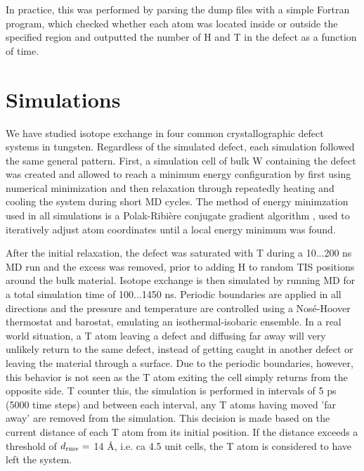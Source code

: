 In practice, this was performed by parsing the dump files with a simple Fortran program, which checked whether each atom was located inside or outside the specified region and outputted the number of H and T in the defect as a function of time.

\chapter{Simulations}

We have studied isotope exchange in four common crystallographic defect systems in tungsten. 
Regardless of the simulated defect, each simulation followed the same general pattern. 
First, a simulation cell of bulk W containing the defect was created and allowed to reach a minimum energy configuration by first using numerical minimization and then relaxation through repeatedly heating and cooling the system during short MD cycles. 
The method of energy minimzation used in all simulations is a Polak-Ribi\`{e}re conjugate gradient algorithm \cite{polak1969note}, used to iteratively adjust atom coordinates until a local energy minimum was found. 

After the initial relaxation, the defect was saturated with T during a 10...200 ns MD run and the excess was removed, prior to adding H to random TIS positions around the bulk material. 
Isotope exchange is then simulated by running MD for a total simulation time of 100...1450 ns. 
Periodic boundaries are applied in all directions and the pressure and temperature are controlled using a Nos\'{e}-Hoover thermostat and barostat, emulating an isothermal-isobaric ensemble. 
In a real world situation, a T atom leaving a defect and diffusing far away will very unlikely return to the same defect, instead of getting caught in another defect or leaving the material through a surface. 
Due to the periodic boundaries, however, this behavior is not seen as the T atom exiting the cell simply returns from the opposite side. 
T counter this, the simulation is performed in intervals of 5 ps (5000 time steps) and between each interval, any T atoms having moved 'far away' are removed from the simulation. 
This decision is made based on the current distance of each T atom from its initial position. 
If the distance exceeds a threshold of $d_{\rm{rmv}} =$ 14 \AA, i.e. ca 4.5 unit cells, the T atom is considered to have left the system. 




